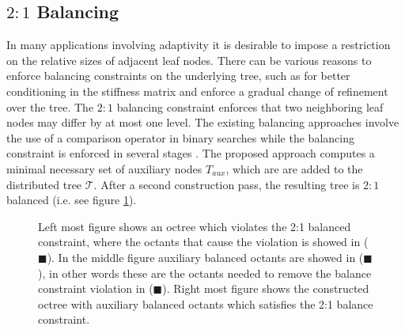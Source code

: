 \subsection{$2:1$ Balancing}
\label{subsec:balancing}
In many applications involving adaptivity it is desirable to impose a restriction on the relative sizes of adjacent leaf nodes\cite{SundarSampathBiros08, SundarSampathAdavaniEtAl07}.  There can be various reasons to enforce balancing constraints on the underlying tree, such as for better conditioning in the stiffness matrix and enforce a gradual change of refinement over the tree. The $2:1$ balancing constraint enforces that two neighboring leaf nodes may differ by at most one level. The existing balancing approaches involve the use of a comparison operator in binary searches while the balancing constraint is enforced in several stages \cite{SundarSampathBiros08, SundarSampathAdavaniEtAl07}. The proposed approach computes a minimal necessary set of auxiliary nodes $T_{aux}$, which are are added to the distributed tree $\mathcal{T}$. After a second construction pass, the resulting tree is $2:1$ balanced (i.e. see figure \ref{fig:aux_bal}).

\begin{figure}
\centering
{}
\caption{Left most figure shows an octree which violates the 2:1 balanced constraint, where the octants that cause the violation is showed in (\textcolor{cpu1}{$\blacksquare$}). In the middle figure auxiliary balanced octants are showed in (\textcolor{cpu2}{$\blacksquare$}), in other words these are the octants needed to remove the balance constraint violation in (\textcolor{cpu1}{$\blacksquare$}). Right most figure shows the constructed octree with auxiliary balanced octants which satisfies the 2:1 balance constraint. \label{fig:aux_bal}}
\end{figure}

